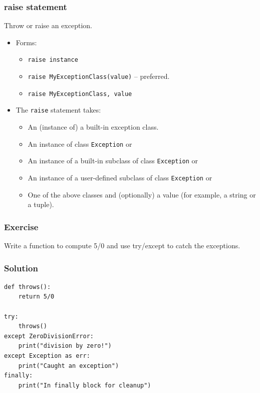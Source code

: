 \begin{frame}[fragile]\frametitle{raise statement}
Throw or raise an exception.
\begin{itemize}
\item Forms:
	\begin{itemize}
	\item \lstinline{raise instance}
	\item \lstinline{raise MyExceptionClass(value)}  -- preferred.
	\item \lstinline{raise MyExceptionClass, value}
	\end{itemize}
\item The  \lstinline{raise}  statement takes:
	\begin{itemize}
	\item An (instance of) a built-in exception class.
	\item An instance of class   \lstinline{Exception}  or
	\item An instance of a built-in subclass of class   \lstinline{Exception}  or
	\item An instance of a user-defined subclass of class   \lstinline{Exception}  or
	\item One of the above classes and (optionally) a value (for example, a string or a tuple).
	\end{itemize}
\end{itemize}
\end{frame}



\begin{frame}[fragile]\frametitle{Exercise}
Write a function to compute 5/0 and use try/except to catch the exceptions.
\end{frame}

\begin{frame}[fragile]\frametitle{Solution}
\begin{lstlisting}
def throws():
    return 5/0

try:
    throws()
except ZeroDivisionError:
    print("division by zero!")
except Exception as err:
    print("Caught an exception")
finally:
    print("In finally block for cleanup")
\end{lstlisting}
\end{frame}



